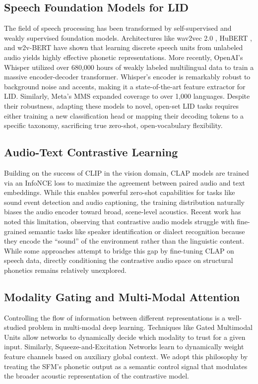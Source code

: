 \documentclass[conference]{IEEEtran}
\begin{document}
\subsection{Speech Foundation Models for LID}
The field of speech processing has been transformed by self-supervised and weakly supervised foundation models. Architectures like wav2vec 2.0 \cite{baevski2020wav2vec}, HuBERT \cite{hsu2021hubert}, and w2v-BERT have shown that learning discrete speech units from unlabeled audio yields highly effective phonetic representations. More recently, OpenAI's Whisper \cite{radford2023robust} utilized over 680,000 hours of weakly labeled multilingual data to train a massive encoder-decoder transformer. Whisper's encoder is remarkably robust to background noise and accents, making it a state-of-the-art feature extractor for LID. Similarly, Meta's MMS \cite{pratap2023scaling} expanded coverage to over 1,000 languages. Despite their robustness, adapting these models to novel, open-set LID tasks requires either training a new classification head or mapping their decoding tokens to a specific taxonomy, sacrificing true zero-shot, open-vocabulary flexibility.

\subsection{Audio-Text Contrastive Learning}
Building on the success of CLIP in the vision domain, CLAP models \cite{elizalde2023clap, wu2023large} are trained via an InfoNCE loss to maximize the agreement between paired audio and text embeddings. While this enables powerful zero-shot capabilities for tasks like sound event detection and audio captioning, the training distribution naturally biases the audio encoder toward broad, scene-level acoustics. Recent work has noted this limitation, observing that contrastive audio models struggle with fine-grained semantic tasks like speaker identification or dialect recognition because they encode the ``sound'' of the environment rather than the linguistic content. While some approaches attempt to bridge this gap by fine-tuning CLAP on speech data, directly conditioning the contrastive audio space on structural phonetics remains relatively unexplored.

\subsection{Modality Gating and Multi-Modal Attention}
Controlling the flow of information between different representations is a well-studied problem in multi-modal deep learning. Techniques like Gated Multimodal Units \cite{arevalo2017gated} allow networks to dynamically decide which modality to trust for a given input. Similarly, Squeeze-and-Excitation Networks \cite{hu2018squeeze} learn to dynamically weight feature channels based on auxiliary global context. We adopt this philosophy by treating the SFM's phonetic output as a semantic control signal that modulates the broader acoustic representation of the contrastive model.
\end{document}
